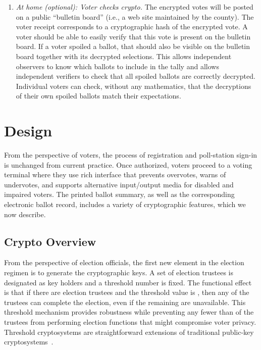 \documentclass[letterpaper, 10pt, twocolumn]{article}
\begin{document}
\begin{enumerate}
\item {\em At home (optional): Voter checks crypto.}
The encrypted votes will be posted on a public ``bulletin board''
 (i.e., a web site maintained by the county).
 The voter receipt corresponds to a cryptographic hash of the encrypted vote.
 A voter should be able to easily verify that this vote is present on the bulletin board.
 If a voter spoiled a ballot, that should also be visible on the bulletin board
 together with its decrypted selections.  This allows independent observers to
 know which ballots to include in the tally and allows independent verifiers
 to check that all spoiled ballots are correctly decrypted.  Individual voters can
 check, without any mathematics,
 that the decryptions of their own spoiled ballots match their expectations.
\end{enumerate}






\section{Design}

\label{sec:design}

From the perspective of voters, the process of registration and poll-station sign-in is unchanged from current practice.  Once authorized, voters proceed to a voting terminal where they use rich interface that prevents overvotes, warns of undervotes, and supports alternative input/output media for disabled and impaired voters. The printed ballot summary, as well as the corresponding electronic ballot record, includes a variety of cryptographic features, which we now describe.







\subsection{Crypto Overview}
From the perspective of election officials, the first new element in the election regimen is 
to generate the cryptographic keys.  
A set of election trustees is designated as key holders and a threshold number is fixed.  
The functional effect is that if there are  election trustees and the threshold value is , then any  of the  trustees can complete the election, even if the remaining  are unavailable.  This threshold mechanism provides robustness while preventing any fewer than  of the trustees from performing election functions that might compromise voter privacy. 
Threshold cryptosystems are straightforward extensions of traditional public-key cryptosystems~\cite{desmedt90threshold}.
\end{document}
